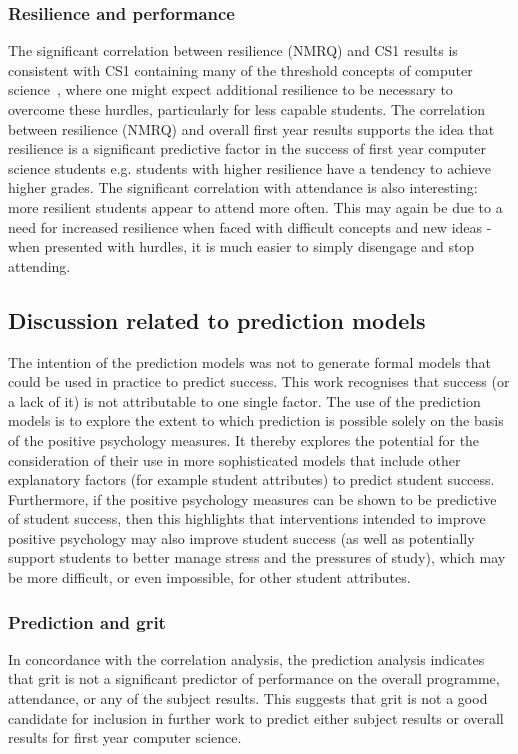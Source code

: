 \documentclass[sigconf]{acmart}
\begin{document}
\subsubsection{Resilience and performance}
The significant correlation between resilience (NMRQ) and CS1 results is consistent with CS1 containing many of the threshold concepts of computer science~\cite{Sanders:2016:TCC:2999541.2999546}, where one might expect additional resilience to be necessary to overcome these hurdles, particularly for less capable students.  The correlation between resilience (NMRQ) and overall first year results supports the idea that resilience is a significant predictive factor in the success of first year computer science students e.g. students with higher resilience have a tendency to achieve higher grades. The significant correlation with attendance is also interesting: more resilient students appear to attend more often. This may again be due to a need for increased resilience when faced with difficult concepts and new ideas - when presented with hurdles, it is much easier to simply disengage and stop attending.
 
\subsection {Discussion related to prediction models}
The intention of the prediction models was not to generate formal models that could be used in practice to predict success. This work recognises that success (or a lack of it) is not attributable to one single factor. The use of the prediction models is to explore the extent to which prediction is possible solely on the basis of the positive psychology measures.  It thereby explores the potential for the consideration of their use in more sophisticated models that include other explanatory factors (for example student attributes) to predict student success. Furthermore, if the positive psychology measures can be shown to be predictive of student success, then this highlights that interventions intended to improve positive psychology may also improve student success (as well as potentially support students to better manage stress and the pressures of study), which may be more difficult, or even impossible, for other student attributes.

\subsubsection{Prediction and grit}
In concordance with the correlation analysis, the prediction analysis indicates that grit is not a significant predictor of performance on the overall programme, attendance, or any of the subject results. This suggests that grit is not a good candidate for inclusion in further work to predict either subject results or overall results for first year computer science. 
\end{document}

